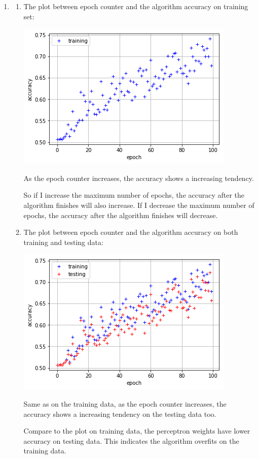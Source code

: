 \documentclass[paper=letter, fontsize=12pt]{article}
\begin{document}
\begin{enumerate}
\item 
\begin{enumerate}
	\item 
	The plot between epoch counter and the algorithm accuracy on training set:
	
	\includegraphics[scale=0.5]{p2q1a.png}
	
	As the epoch counter increases, the accuracy shows a increasing tendency.
	
	So if I increase the maximum number of epochs, the accuracy after the algorithm finishes will also increase. If I decrease the maximum number of epochs, the accuracy after the algorithm finishes will decrease.
	
	\item 
	The plot between epoch counter and the algorithm accuracy on both training and testing data:
	
	\includegraphics[scale=0.5]{p2q1b.png}
	
	Same as on the training data, as the epoch counter increases, the accuracy shows a increasing tendency on the testing data too.
	
	Compare to the plot on training data, the perceptron weights have lower accuracy on testing data. This indicates the algorithm overfits on the training data.
	

\end{enumerate}
\end{enumerate}
\end{document}
